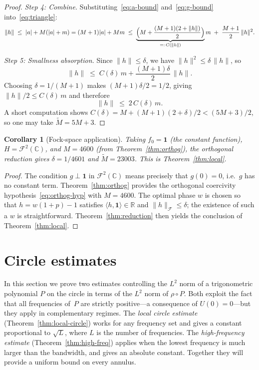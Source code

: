 \documentclass[11pt]{amsart}
\newtheorem{corollary}[theorem]{Corollary}
\theoremstyle{definition}
\theoremstyle{remark}
\begin{document}
\begin{proof}
\medskip
\noindent
\emph{Step 4: Combine.}\;
Substituting~\eqref{eq:a-bound} and~\eqref{eq:g-bound}
into~\eqref{eq:triangle}:
\[
\lVert h \rVert
\;\le\;
\lvert a \rvert + M(\lvert a \rvert + m)
= (M+1)\lvert a \rvert + Mm
\;\le\;
\underbrace{\Bigl(M + \frac{(M+1)(2+\lVert h \rVert)}{2}\Bigr)}_{=:\, C(\lVert h \rVert)}
m
\;+\; \frac{M+1}{2}\,\lVert h \rVert^2.
\]

\medskip
\noindent
\emph{Step 5: Smallness absorption.}\;
Since $\lVert h \rVert \le \delta$, we have $\lVert h \rVert^2 \le \delta\,\lVert h \rVert$, so
\[
\lVert h \rVert
\;\le\; C(\delta)\, m + \frac{(M+1)\delta}{2}\,\lVert h \rVert.
\]
Choosing $\delta = 1/(M+1)$ makes $(M+1)\delta/2 = 1/2$, giving
$\lVert h \rVert/2 \le C(\delta)\, m$ and therefore
\[
\lVert h \rVert \;\le\; 2\, C(\delta)\, m.
\]
A short computation shows
$C(\delta) = M + (M+1)(2 + \delta)/2 < (5M+3)/2$, so one may take
$\widetilde{M} = 5M + 3$.
\end{proof}

\begin{corollary}[Fock-space application]\label{cor:fock-local}
Taking $f_0 = \mathbf{1}$ (the constant function), $H = \mathcal{F}^2(\mathbb{C})$, and
$M = 4600$ (from Theorem~\ref{thm:orthog}), the orthogonal reduction gives
$\delta = 1/4601$ and $\widetilde{M} = 23003$.
This is Theorem~\ref{thm:local}.
\end{corollary}

\begin{proof}
The condition $g \perp \mathbf{1}$ in $\mathcal{F}^2(\mathbb{C})$ means precisely that
$g(0) = 0$, i.e.\ $g$ has no constant term.
Theorem~\ref{thm:orthog} provides the orthogonal coercivity
hypothesis~\eqref{eq:orthog-hyp} with $M = 4600$.
The optimal phase $w$ is chosen so that
$h = w(1 + p) - 1$ satisfies $\langle h,\mathbf{1}\rangle \in \mathbb{R}$ and
$\lVert h \rVert_\mathcal{F} \le \delta$; the existence of such a $w$ is straightforward.
Theorem~\ref{thm:reduction} then yields the conclusion of
Theorem~\ref{thm:local}.
\end{proof}

 \section{Circle estimates}\label{sec:circle}

In this section we prove two estimates controlling the $L^2$ norm of a
trigonometric polynomial $P$ on the circle in terms of the $L^2$ norm of
$\rho \circ P$.  Both exploit the fact that all frequencies of~$P$ are
strictly positive---a consequence of $U(0) = 0$---but they apply in
complementary regimes.  The \emph{local circle estimate}
(Theorem~\ref{thm:local-circle}) works for any frequency set and gives a
constant proportional to $\sqrt{L}$, where $L$ is the number of frequencies.
The \emph{high-frequency estimate} (Theorem~\ref{thm:high-freq}) applies
when the lowest frequency is much larger than the bandwidth, and gives an
absolute constant.  Together they will provide a uniform bound on every
annulus.
\end{document}
